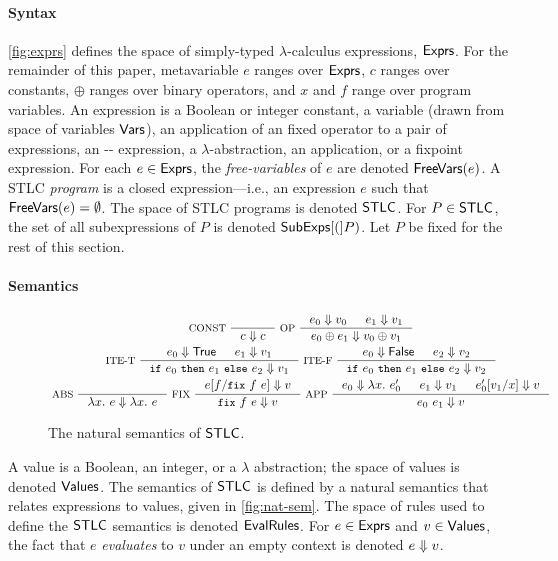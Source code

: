 \paragraph{Syntax} \autoref{fig:exprs} defines the space of
simply-typed $\lambda$-calculus expressions, $\mathsf{Exprs}$.
%
For the remainder of this paper, metavariable $e$ ranges over
$\mathsf{Exprs}$, %
$c$ ranges over constants, %
$\oplus$ ranges over binary operators, and $x$ and $f$ range over
program variables.
%
An expression is a Boolean or integer constant, %
a variable (drawn from space of variables $\mathsf{Vars}$), %
an application of an fixed operator to a pair of expressions, %
an -- expression, %
a $\lambda$-abstraction, %
an application, or %
a fixpoint expression.
%
For each $e \in \mathsf{Exprs}$, the \emph{free-variables} of $e$ are denoted
$\mathsf{FreeVars}(e)$.
%
A STLC \emph{program} is a closed expression---i.e., an expression $e$
such that $\mathsf{FreeVars}(e) = \emptyset$.
%
The space of STLC programs is denoted $\mathsf{STLC}$.
%
For $P \in \mathsf{STLC}$, the set of all subexpressions of $P$ is denoted
$\mathsf{SubExps}[ ( ]P)$.
%
Let $P$ be fixed for the rest of this section.

\paragraph{Semantics}
%
\begin{figure}
  \centering
  \begin{gather*}
  \inference[ CONST ]{ }{ c \evalsto c }
  \inference[ OP ]{ %
    e_0 \evalsto v_0 & %
    e_1 \evalsto v_1 } %
  { e_0 \oplus e_1 \evalsto v_0 \oplus v_1 } \\
  \inference[ ITE-T ]{ %
    e_0 \evalsto \true & %
    e_1 \evalsto v_1 } %
  { \ite{ e_0 }{ e_1 }{ e_2 } \evalsto v_1 }
  \inference[ ITE-F ]{ %
    e_0 \evalsto \false & %
    e_2 \evalsto v_2 } %
  { \ite{ e_0 }{ e_1 }{ e_2 } \evalsto v_2 } \\
  \inference[ ABS ]{ } %
  { \lambda x.\ e \evalsto \lambda x.\ e }
  \inference[ FIX ]{ \replace{e}{ \fix{ f }{ e } }{ f } \evalsto v } %
  { \fix{ f }{ e } \evalsto v }
  \inference[ APP ]{ %
    e_0 \evalsto \lambda x.\ e_0' & %
    e_1 \evalsto v_1 & %
    \replace{ e_0' }{ x }{ v_1 } \evalsto v }
  { e_0\ e_1 \evalsto v } 
  \end{gather*}
  \caption{The natural semantics of $\mathsf{STLC}$.}
  \label{fig:nat-sem}
\end{figure}
%
A value is a Boolean, an integer, or a $\lambda$ abstraction;
%
the space of values is denoted $\mathsf{Values}$.
%
The semantics of $\mathsf{STLC}$ is defined by a natural semantics that
relates expressions to values, given in \autoref{fig:nat-sem}.
%
The space of rules used to define the $\mathsf{STLC}$ semantics is denoted
$\mathsf{EvalRules}$.
%
For $e \in \mathsf{Exprs}$ and $v \in \mathsf{Values}$, the fact that $e$
\emph{evaluates} to $v$ under an empty context is denoted $e \Downarrow
v$.

